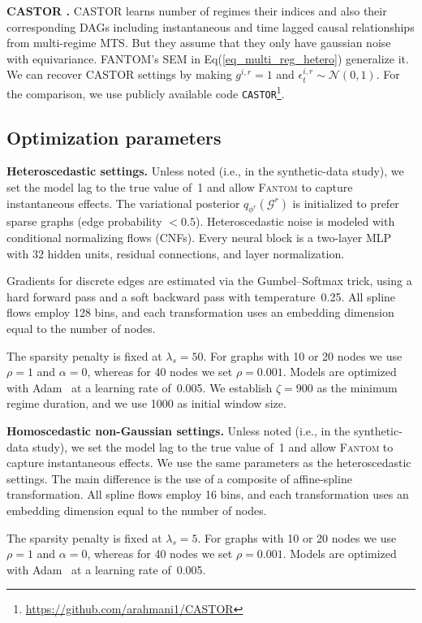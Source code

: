 \textbf{CASTOR \citep{rahmanicausal}. } CASTOR learns number of regimes their indices and also their corresponding DAGs including instantaneous and time lagged causal relationships from multi-regime MTS. But they assume that they only have gaussian noise with equivariance. FANTOM's SEM in Eq(\ref{eq_multi_reg_hetero}) generalize it. We can recover CASTOR settings by making \(g^{i,r}=1\) and $\epsilon_t^{i,r} \sim \mathcal{N}(0,1)$. For the comparison, we use publicly available code \texttt{CASTOR}\footnote{\url{https://github.com/arahmani1/CASTOR}}.
\subsection{Optimization parameters}
\label{optim_param}
\textbf{Heteroscedastic settings. }
Unless noted (i.e., in the synthetic-data study), we set the model lag to the true value of~1 and allow \textsc{Fantom} to capture instantaneous effects.  
The variational posterior $q_{\phi^r}(\mathcal{G}^r)$ is initialized to prefer sparse graphs (edge probability $<0.5$).  
Heteroscedastic noise is modeled with conditional normalizing flows (CNFs). Every neural block is a two-layer MLP with 32 hidden units, residual connections, and layer normalization.

Gradients for discrete edges are estimated via the Gumbel–Softmax trick, using a hard forward pass and a soft backward pass with temperature~0.25.  
All spline flows employ 128 bins, and each transformation uses an embedding dimension equal to the number of nodes.

The sparsity penalty is fixed at $\lambda_s = 50$. For graphs with 10 or 20 nodes we use $\rho = 1$ and $\alpha = 0$, whereas for 40 nodes we set $\rho = 0.001$.  
Models are optimized with Adam~\citep{kingma2014adam} at a learning rate of~0.005. We establish $\zeta = 900$ as the minimum regime duration, and we use 1000 as initial window size.

\textbf{Homoscedastic non-Gaussian settings. }
Unless noted (i.e., in the synthetic-data study), we set the model lag to the true value of~1 and allow \textsc{Fantom} to capture instantaneous effects. We use the same parameters as the heteroscedastic settings. The main difference is the use of a composite of affine-spline transformation. 
All spline flows employ 16 bins, and each transformation uses an embedding dimension equal to the number of nodes.

The sparsity penalty is fixed at $\lambda_s = 5$. For graphs with 10 or 20 nodes we use $\rho = 1$ and $\alpha = 0$, whereas for 40 nodes we set $\rho = 0.001$.  
Models are optimized with Adam~\citep{kingma2014adam} at a learning rate of~0.005.